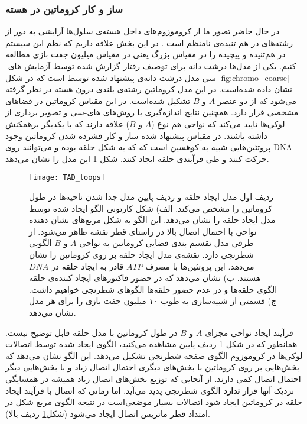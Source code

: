 \subsubsection{ساز و کار کروماتین در هسته }
در حال حاضر تصور ما از کروموزوم‌های داخل هسته‌ی سلول‌ها آرایشی به دور از رشته‌های در هم تنیده‌ی نامنظم است \cite{Gibcus:2013fj,Lieberman-Aiden289}. در این بخش علاقه داریم که نظم این سیستم در هم‌تنیده‌ و پیچیده‌ را در مقیاس بزرگ یعنی در مقیاس میلیون جفت بازی مطالعه کنیم. یکی از مدل‌ها درشت دانه برای توصیف رفتار گزارش شده توسط آزمایش های-سی  مدل درشت‌ دانه‌ی پیشنهاد شده توسط \cite{Lieberman-Aiden289} است که در شکل \ref{fig:chromo_coarse} نشان داده شده‌است. در این مدل کروماتین رشته‌ی بلندی درون هسته در نظر گرفته می‌شود که از دو عنصر $A$ و $B$ تشکیل شده‌است.   در این مقیاس کروماتین در فضاهای مشخصی قرار دارد\cite{Gibcus:2013fj,Lieberman-Aiden289}. همچنین نتایج اندازه‌گیری با روش‌های های-سی و تصویر برداری از لوکی‌ها تایید می‌کند که نواحی هم نوع ($A$ و $B$) علاقه دارند که با یکدیگر برهمکنش داشته باشند. در مقیاس پیشنهاد شده  ساز و کار فشرده شدن کروماتین وجود پروتئین‌هایی شبیه به کوهسین است که که به شکل حلقه بوده و می‌توانند روی DNA حرکت کنند و طی فرآیندی حلقه‌ ایجاد کنند\cite{Nuebler196261}. شکل \ref{fig:TADloops} این مدل را نشان می‌دهد.

\begin{figure}[htbp]
\begin{center}
\texttt{[image: TAD\_loops]}
\caption{
ردیف اول مدل ایجاد حلقه و ردیف پایین مدل جدا شدن ناحیه‌ها در طول کروماتین را مشخص می‌کند. الف) شکل کارتونی  الگو ایجاد شده توسط مدل ایجاد حلقه‌ را نشان می‌دهد. این الگو به شکل مربع‌های نشان دهنده نواحی با احتمال اتصال بالا در راستای قطر نقشه‌ ظاهر می‌شود. از طرفی مدل تقسیم بندی فضایی کروماتین به نواحی $A$ و $B$ الگویی شطرنجی دارد. نقشه‌ی مدل ایجاد حلقه بر روی کروماتین را نشان می‌دهد. این پروتئین‌ها با مصرف $ATP$ قادر به ایجاد حلقه در $DNA$ هستند. ب) نشان می‌دهد که در حضور فاکتورهای ایجاد کننده‌ی حلقه الگوی حلقه‌ها  و در عدم حضور حلقه‌ها الگوهای شطرنجی خواهیم داشت. ج) قسمتی از شبیه‌سازی به طوب ۱۰ میلیون جفت بازی را برای هر مدل نشان می‌دهد.
}
\label{fig:TADloops}
\end{center}
\end{figure}

فرآیند ایجاد نواحی مجزای $A$ و $B$ در طول کروماتین با مدل حلقه قابل توضیح نیست. همانطور که در شکل \ref{fig:TADloops} ردیف پایین مشاهده می‌کنید، الگوی ایجاد شده توسط اتصالات لوکی‌ها در کروموزوم الگوی صفحه شطرنجی تشکیل می‌دهد. این الگو نشان می‌دهد که بخش‌هایی بر روی کروماتین با بخش‌های دیگری احتمال اتصال زیاد و با بخش‌هایی دیگر احتمال اتصال کمی دارند. از آنجایی که توزیع بخش‌های اتصال زیاد همیشه در همسایگی نزدیک آنها قرار \textbf{ندارد} الگوی شطرنجی پدید می‌آید. اما زمانی که اتصال با فرآیند ایجاد حلقه در کروماتین ایجاد ‌شود اتصالات بسیار موضعی‌است در نتیجه الگوی مربع شکل در امتداد قطر ماتریس اتصال ایجاد می‌شود (شکل\ref{fig:TADloops} ردیف بالا).
 
